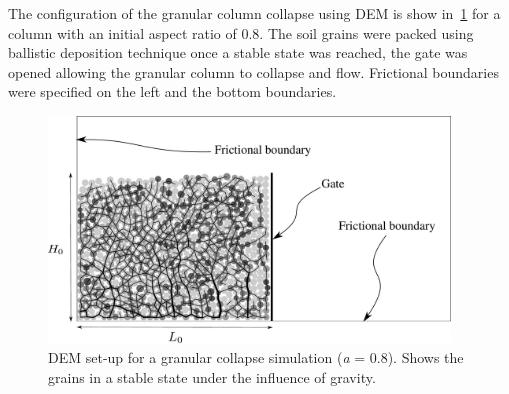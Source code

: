 The configuration of the granular column collapse using DEM is show 
in~\cref{fig:DEM_Column_Sample} for a column with an initial aspect ratio of 
0.8. The soil grains were packed using ballistic deposition technique once a 
stable state was reached, the gate was opened allowing the granular column to 
collapse and flow. Frictional boundaries were specified on the left and 
the bottom boundaries.

\begin{figure}
\centering
\includegraphics[width=0.95\textwidth]{DEM_Column_Sample}
\caption[DEM set-up of a granular collapse simulation (\textit{a} = 0.8)]{DEM 
set-up for a granular collapse simulation (\textit{a} = 0.8). 
Shows the grains in a stable state under the influence of gravity.}
\label{fig:DEM_Column_Sample}
\end{figure}

